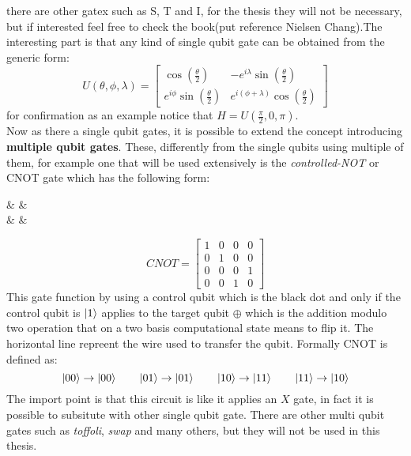 there are other gatex such as S, T and I, for the thesis they will not be necessary, but if interested feel free to check the book(put reference Nielsen Chang).The interesting part is that any kind of single qubit gate can be obtained from the generic form:
\begin{equation}\label{generic gate}
	U(\theta,  \phi, \lambda) =  \begin{bmatrix}
		\cos(\frac{\theta}{2}) & -e^{i\lambda} \sin(\frac{\theta}{2})\\
		e^{i\phi}\sin(\frac{\theta}{2}) & e^{i(\phi+ \lambda)}\cos(\frac{\theta}{2})
	\end{bmatrix}
\end{equation}
for confirmation as an example notice that $H = U(\frac{\pi}{2}, 0, \pi)$.\\
Now as there a single qubit gates, it is possible to extend the concept introducing \textbf{multiple qubit gates}. These, differently from the single qubits using multiple of them, for example one that will be used extensively is the \textit{controlled-NOT} or CNOT gate which has the following form:\\
\begin{center}
	\begin{quantikz}[scale = 3.0]
		 &   & \qw\\
		 &  \targ{}  & \qw
	\end{quantikz}
\end{center}
\begin{equation*}
	CNOT = 
	\begin{bmatrix}
		1 & 0 & 0 & 0 \\
		0 & 1 & 0 & 0 \\
		0 & 0 & 0 & 1 \\
		0 & 0 & 1 & 0
	\end{bmatrix}
\end{equation*} 
This gate function by using a control qubit which is the black dot and only if the control qubit is $\ket{1}$ applies to the target qubit $\oplus$ which is the addition modulo two operation that on a two basis computational state means to flip it. The horizontal line repreent the wire used to transfer the qubit. Formally CNOT is defined as:
\begin{equation*}
	\ket{00} \to \ket{00} \qquad \ket{01} \to \ket{01} \qquad \ket{10} \to \ket{11} \qquad \ket{11} \to \ket{10}
\end{equation*}
The import point is that this circuit is like it applies an $X$ gate, in fact it is possible to subsitute with other single qubit gate. There are other multi qubit gates such as \textit{toffoli}, \textit{swap} and many others, but they will not be used in this thesis.
